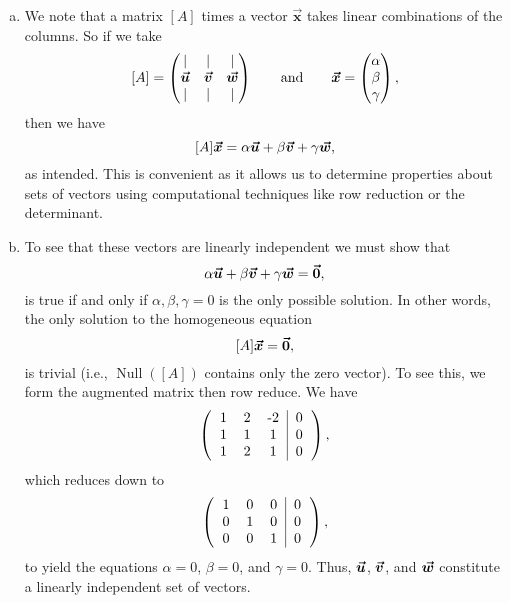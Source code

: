 \documentclass[12pt]{article} %
\newcommand{\vecx}{\boldsymbol{\vec{x}}}
\begin{document}
\begin{solution}
    \begin{enumerate}[(a)]
        \item We note that a matrix $[A]$ times a vector $\vecx$ takes linear combinations of the columns. So if we take
        \[
            [A] = \begin{pmatrix} \vert & \vert & \vert \\ \vecu & \vecv & \vecw \\ \vert & \vert & \vert \end{pmatrix} \qquad \textrm{and} \qquad \vecx = \begin{pmatrix} \alpha \\ \beta \\ \gamma \end{pmatrix},
        \]
        then we have
        \[
        [A]\vecx = \alpha \vecu + \beta \vecv + \gamma \vecw,
        \]
        as intended. This is convenient as it allows us to determine properties about sets of vectors using computational techniques like row reduction or the determinant.
        \item To see that these vectors are linearly independent we must show that
        \[
        \alpha \boldsymbol{\boldsymbol{\vec{u}}} + \beta \boldsymbol{\boldsymbol{\vec{v}}} + \gamma \boldsymbol{\boldsymbol{\vec{w}}} = \boldsymbol{\vec{0}},
        \]
        is true if and only if $\alpha,\beta,\gamma = 0$ is the only possible solution.  In other words, the only solution to the homogeneous equation
        \[
        [A]\vecx = \zerovec,
        \]
        is trivial (i.e., $\operatorname{Null}([A])$ contains only the zero vector).  To see this, we form the augmented matrix then row reduce. We have
        \[
        \left( \begin{tabular}{ccc|c} 1 & 2 & -2 & 0 \\ 1 & 1 & 1 & 0 \\ 1 & 2 & 1 & 0 \end{tabular} \right),
        \]
        which reduces down to
        \[
        \left( \begin{tabular}{ccc|c} 1 & 0 & 0 & 0\\ 0 & 1 & 0 & 0\\ 0 & 0 & 1 & 0\end{tabular} \right),
        \]
        to yield the equations $\alpha = 0$, $\beta = 0$, and $\gamma=0$.  Thus, $\boldsymbol{\boldsymbol{\vec{u}}}$, $\boldsymbol{\boldsymbol{\vec{v}}}$, and $\boldsymbol{\boldsymbol{\vec{w}}}$ constitute a linearly independent set of vectors.


\end{enumerate}
\end{solution}
\end{document}

